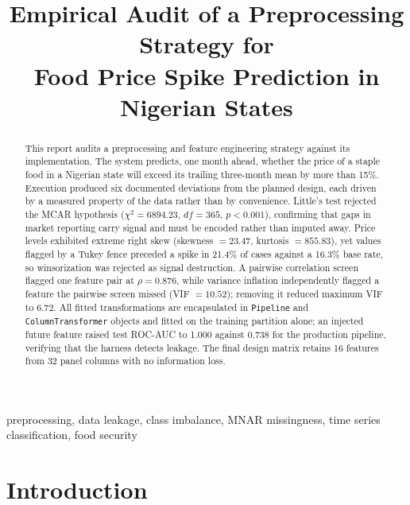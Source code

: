 \documentclass[conference]{IEEEtran}
\begin{document}
\title{Empirical Audit of a Preprocessing Strategy for\\
Food Price Spike Prediction in Nigerian States}

\author{
}

\maketitle

\begin{abstract}
This report audits a preprocessing and feature engineering strategy against its
implementation. The system predicts, one month ahead, whether the price of a
staple food in a Nigerian state will exceed its trailing three-month mean by
more than 15\%. Execution produced six documented deviations from the planned
design, each driven by a measured property of the data rather than by
convenience. Little's test rejected the MCAR hypothesis
($\chi^2 = 6894.23$, $df = 365$, $p < 0.001$), confirming that gaps in market
reporting carry signal and must be encoded rather than imputed away. Price
levels exhibited extreme right skew (skewness $= 23.47$, kurtosis $= 855.83$),
yet values flagged by a Tukey fence preceded a spike in 21.4\% of cases against
a 16.3\% base rate, so winsorization was rejected as signal destruction. A
pairwise correlation screen flagged one feature pair at
$\rho = 0.876$, while variance inflation independently flagged a feature the
pairwise screen missed (VIF $= 10.52$); removing it reduced maximum VIF to
6.72. All fitted transformations are encapsulated in \texttt{Pipeline} and
\texttt{ColumnTransformer} objects and fitted on the training partition alone;
an injected future feature raised test ROC-AUC to 1.000 against 0.738 for the
production pipeline, verifying that the harness detects leakage. The final
design matrix retains 16 features from 32 panel columns with no information
loss.
\end{abstract}

\begin{IEEEkeywords}
preprocessing, data leakage, class imbalance, MNAR missingness, time series
classification, food security
\end{IEEEkeywords}

\section{Introduction}
\end{document}
